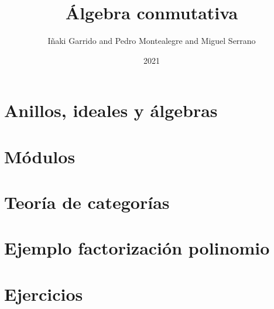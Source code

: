 \documentclass[a4paper,12pt]{book}
\title{Álgebra conmutativa}
\author{Iñaki Garrido and Pedro Montealegre and Miguel Serrano}
\date{2021}
\theoremstyle{definition}
\begin{document}
\maketitle
\chapter{Anillos, ideales y álgebras}

\chapter{Módulos}



\appendix
\chapter{Teoría de categorías}

\chapter{Ejemplo factorización polinomio}

\chapter{Ejercicios}

\end{document}
